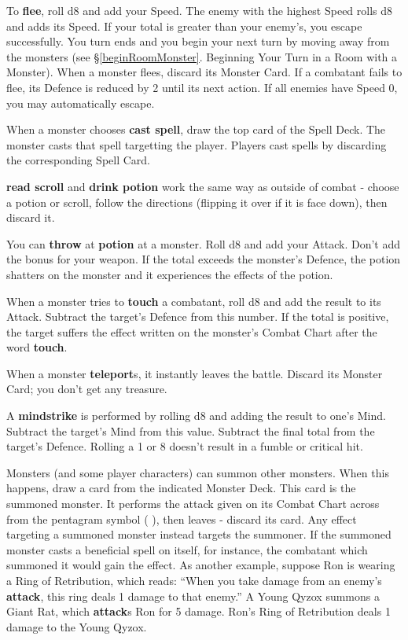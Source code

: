 \documentclass{book}
\begin{document}
To \textbf{flee}, roll d8 and add your Speed. The enemy with the highest Speed rolls d8 and adds its Speed. If your total is greater than your enemy’s, you escape successfully. You turn ends and you begin your next turn by moving away from the monsters (see §\ref{beginRoomMonster}. Beginning Your Turn in a Room with a Monster). When a monster flees, discard its Monster Card. If a combatant fails to flee, its Defence is reduced by 2 until its next action. If all enemies have Speed 0, you may automatically escape.

When a monster chooses \textbf{cast spell}, draw the top card of the Spell Deck. The monster casts that spell targetting the player. Players cast spells by discarding the corresponding Spell Card.

\textbf{read scroll} and \textbf{drink potion} work the same way as outside of combat - choose a potion or scroll,
follow the directions (flipping it over if it is face down), then discard it.

You can \textbf{throw} at \textbf{potion} at a monster. Roll d8 and add your Attack. Don’t add the bonus for your weapon. If the total exceeds the monster’s Defence, the potion shatters on the monster and it experiences the
effects of the potion.

When a monster tries to \textbf{touch} a combatant, roll d8 and add the result to its Attack. Subtract the target’s Defence from this number. If the total is positive, the target suffers the effect written on the monster’s Combat Chart after the word \textbf{touch}.

When a monster \textbf{teleport}s, it instantly leaves the battle. Discard its Monster Card; you don’t get any treasure.

A \textbf{mindstrike} is performed by rolling d8 and adding the result to one’s Mind. Subtract the target’s Mind from this value. Subtract the final total from the target’s Defence. Rolling a 1 or 8 doesn’t result in a fumble or critical hit.  

Monsters (and some player characters) can summon other monsters. When this happens, draw a card from the indicated Monster Deck. This card is the summoned monster. It performs the attack given on its Combat Chart across from the pentagram symbol ( ), then leaves - discard its card.
Any effect targeting a summoned monster instead targets the summoner. If the summoned monster casts a beneficial spell on itself, for instance, the combatant which summoned it would gain the effect. As another example, suppose Ron is wearing a Ring of Retribution, which reads: “When you take damage from an enemy’s \textbf{attack}, this ring deals 1 damage to that enemy.” A Young Qyzox summons a Giant Rat, which \textbf{attack}s Ron for 5 damage. Ron’s Ring of Retribution deals 1 damage to the Young Qyzox.
\end{document}

